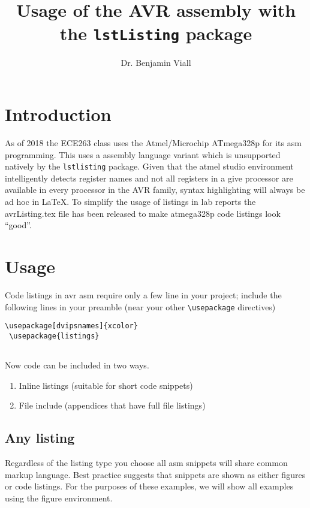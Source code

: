 \documentclass[titlepage]{article}
\begin{document}
\title{Usage of the AVR assembly with the \texttt{lstListing} package}
\author {Dr. Benjamin Viall}


\maketitle



\section{Introduction}
As of 2018 the ECE263 class uses the Atmel/Microchip ATmega328p for its asm programming. This uses a assembly language variant which is unsupported natively by the \texttt{lstlisting} package. Given that the atmel studio environment intelligently detects register names and not all registers in a give processor are available in every processor in the AVR family, syntax highlighting will always be ad hoc in \LaTeX. To simplify the usage of listings in lab reports the avrListing.tex file has been released to make atmega328p code listings look ``good''.

\section {Usage}
Code listings in avr asm require only a few line in your project; include the following lines in your preamble (near your other \verb|\usepackage| directives)

\begin{lstlisting}[language=Tex,style=ListingSample]
 \usepackage[dvipsnames]{xcolor}
 \usepackage{listings}
 
\end{lstlisting}

\noindent Now code can be included in two ways. 
\begin{enumerate}
	\item Inline listings (suitable for short code snippets)
	\item File include (appendices that have full file listings)
\end{enumerate}

\subsection{Any listing}
 Regardless of the listing type you choose all asm snippets will share common markup language.  Best practice suggests that snippets are shown as either figures or code listings. For the purposes of these examples, we will show all examples using the figure environment. 
 
\end{document}

